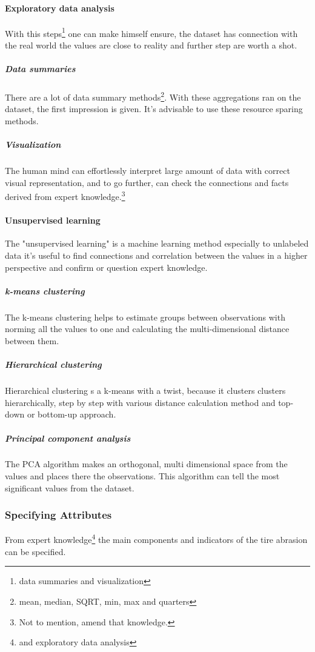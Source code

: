 		\paragraph{Exploratory data analysis}
			With this steps\footnote{data summaries and visualization} one can make himself ensure, the dataset has connection with the real world the values are close to reality and further step are worth a shot.
			\subparagraph{Data summaries}
			There are a lot of data summary methods\footnote{mean, median, SQRT, min, max and quarters}. With these aggregations ran on the dataset, the first impression is given. It's advisable to use these resource sparing methods.
			\subparagraph{Visualization}
			The human mind can effortlessly interpret large amount of data with correct visual representation, and to go further, can check the connections and facts derived from expert knowledge.\footnote{Not to mention, amend that knowledge.} 
		\paragraph{Unsupervised learning}
		The "unsupervised learning" \cite{UnsuplearnBook} is a machine learning method especially to unlabeled data it's useful to find connections and correlation between the values in a higher perspective and confirm or question expert knowledge.

		\subparagraph{k-means clustering}
		\cite{k-means}\cite{kmeans2} The k-means clustering helps to estimate groups between observations with norming all the values to one and calculating the multi-dimensional distance between them.
		\subparagraph{Hierarchical clustering}
		\cite{h-clust}\cite{h-clust2}\cite{Clustering} Hierarchical clustering s a k-means with a twist, because it clusters clusters hierarchically, step by step with various distance calculation method and top-down or bottom-up approach.
		\subparagraph{Principal component analysis}
		The PCA \cite{PCA} algorithm makes an orthogonal, multi dimensional space from the values and places there the observations. This algorithm can tell the most significant values from the dataset.
	\subsubsection{Specifying Attributes}
	From expert knowledge\footnote{and exploratory data analysis} the main components and indicators of the tire abrasion can be specified.


